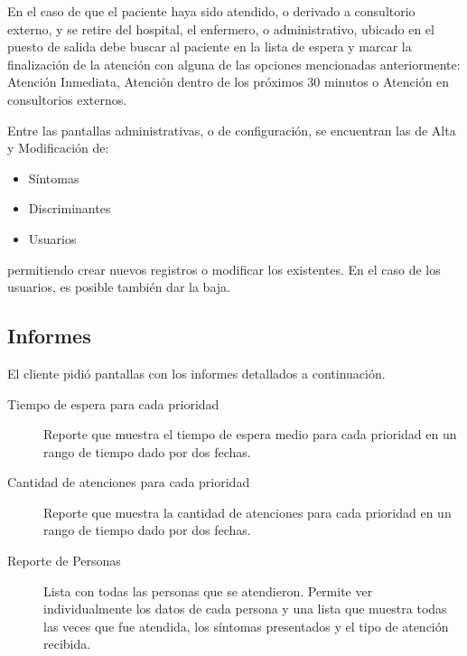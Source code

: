 En el caso de que el paciente haya sido atendido, o derivado a consultorio externo, y se retire del hospital, el enfermero, o administrativo, ubicado en el puesto de salida debe buscar al paciente en la lista de espera y marcar la finalización de la atención con alguna de las opciones mencionadas anteriormente: Atención Inmediata, Atención dentro de los próximos 30 minutos o Atención en consultorios externos.

Entre las pantallas administrativas, o de configuración, se encuentran las de Alta y Modificación de:
\begin{itemize}
\item Síntomas
\item Discriminantes
\item Usuarios
\end{itemize}
%
permitiendo crear nuevos registros o modificar los existentes. En el caso de los usuarios, es posible también dar la baja.




\subsection{Informes}
El cliente pidió pantallas con los informes detallados a continuación.

\begin{description}
\item[Tiempo de espera para cada prioridad] 

Reporte que muestra el tiempo de espera medio para cada prioridad en un rango de tiempo dado por dos fechas. 


\item[Cantidad de atenciones para cada prioridad] 

Reporte que muestra la cantidad de atenciones para cada prioridad en un rango de tiempo dado por dos fechas.
\item[Reporte de Personas] 

Lista con todas las personas que se atendieron. Permite ver individualmente los datos de cada persona y una lista que muestra todas las veces que fue atendida, los síntomas presentados y el tipo de atención recibida.
\end{description}
